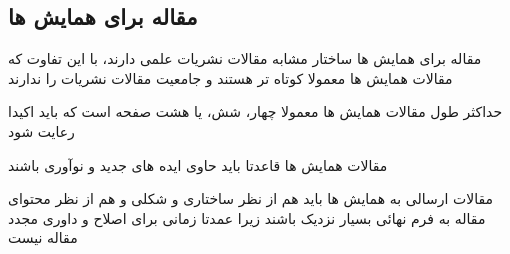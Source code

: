 \documentclass[14pt]{beamer}
\newcommand{\sectionfontsize}{\fontsize{22pt}{0pt}\selectfont}
\newcommand{\framefontsizelarge}{\fontsize{18pt}{0pt}\selectfont}
\newcommand{\frametitlefontsize}{\fontsize{20pt}{0pt}\selectfont}
\begin{document}
\begin{persian}
	\section{\sectionfontsize مقاله برای همایش ها}	

	\begin{frame}[plain]{\frametitlefontsize مقاله برای همایش ها}
		\framefontsizelarge
		ساختار مشابه مقالات نشریات علمی دارند، با این تفاوت که مقالات همایش ها معمولا کوتاه تر هستند و جامعیت مقالات نشریات را ندارند
		
		حداکثر طول مقالات همایش ها معمولا چهار، شش، یا هشت صفحه است که باید اکیدا رعایت شود
		
		مقالات همایش ها قاعدتا باید حاوی ایده های جدید و نوآوری باشند
		
		مقالات ارسالی به همایش ها باید هم از نظر ساختاری و شکلی و هم از نظر محتوای مقاله به فرم نهائی بسیار نزدیک باشند زیرا عمدتا زمانی برای اصلاح و داوری مجدد مقاله نیست
	\end{frame}	

\end{persian}
\end{document}
